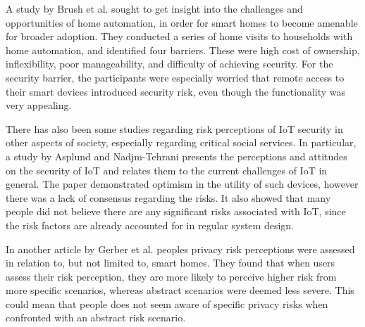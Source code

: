 A study by Brush et al. \cite{Brush2011} sought to get insight into the challenges and opportunities of home automation, in order for smart homes to become amenable for broader adoption. They conducted a series of home visits to households with home automation, and identified four barriers. These were high cost of ownership, inflexibility, poor manageability, and difficulty of achieving security. For the security barrier, the participants were especially worried that remote access to their smart devices introduced security risk, even though the functionality was very appealing. 

There has also been some studies regarding risk perceptions of IoT security in other aspects of society, especially regarding critical social services. In particular, a study by Asplund and Nadjm-Tehrani \cite{Asplund2016} presents the perceptions and attitudes on the security of IoT and relates them to the current challenges of IoT in general. The paper demonstrated optimism in the utility of such devices, however there was a lack of consensus regarding the risks. It also showed that many people did not believe there are any significant risks associated with IoT, since the risk factors are already accounted for in regular system design. 

In another article by Gerber et al. \cite{Gerber2019} peoples privacy risk perceptions were assessed in relation to, but not limited to, smart homes. They found that when users assess their risk perception, they are more likely to perceive higher risk from more specific scenarios, whereas abstract scenarios were deemed less severe. This could mean that people does not seem aware of specific privacy risks when confronted with an abstract risk scenario. 